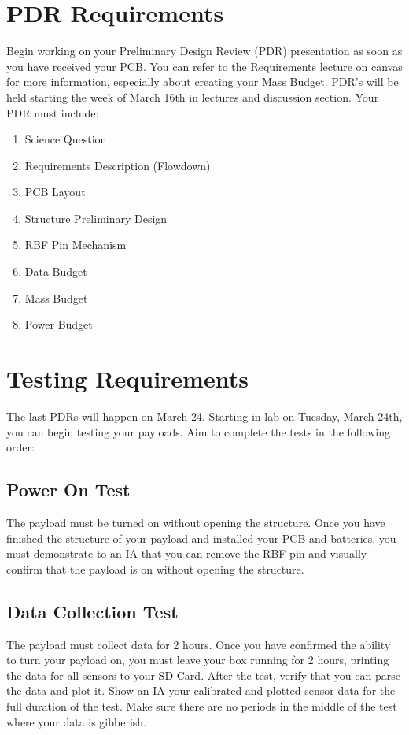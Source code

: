 \documentclass[12pt]{article}
\begin{document}
    \section*{PDR Requirements}
    Begin working on your Preliminary Design Review (PDR) presentation as soon as you have received your PCB. You can refer to the Requirements lecture on canvas for more information, especially about creating your Mass Budget. PDR's will be held starting the week of March 16th in lectures and discussion section.
    \newline
    \newline
    Your PDR must include:
    \begin{enumerate}
        \item Science Question
        \item Requirements Description (Flowdown)
        \item PCB Layout
        \item Structure Preliminary Design
        \item RBF Pin Mechanism
        \item Data Budget
        \item Mass Budget
        \item Power Budget
    \end{enumerate}
    
    \section*{Testing Requirements}
    The last PDRs will happen on March 24. Starting in lab on Tuesday, March 24th, you can begin testing your payloads. Aim to complete the tests in the following order:
    
    \subsection*{Power On Test}
    The payload must be turned on without opening the structure.
    \newline \newline
     Once you have finished the structure of your payload and installed your PCB and batteries, you must demonstrate to an IA that you can remove the RBF pin and visually confirm that the payload is on without opening the structure.
    
    \subsection*{Data Collection Test}
    The payload must collect data for 2 hours. \newline \newline
   Once you have confirmed the ability to turn your payload on, you must leave your box running for 2 hours, printing the data for all sensors to your SD Card. After the test, verify that you can parse the data and plot it. Show an IA your calibrated and plotted sensor data for the full duration of the test. Make sure there are no periods in the middle of the test where your data is gibberish.
    
\end{document}
